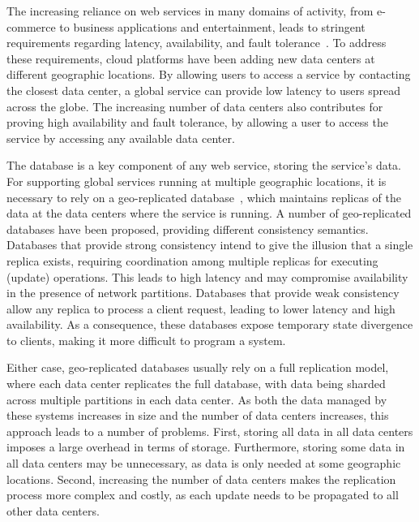 \documentclass[sigplan,10pt]{acmart}
\begin{document}
The increasing reliance on web services in many domains of activity, from e-commerce to business applications
and entertainment, leads to stringent requirements regarding latency, availability,
and fault tolerance~\cite{Schurman2009latency,gomez}.
To address these requirements, cloud platforms have been adding new data centers at different geographic 
locations. By allowing users to access a service by contacting the closest data center, a global service can
provide low latency to users spread across the globe. The increasing number of data centers also contributes
for proving high availability and fault tolerance, by allowing a user to access the service by accessing any
available data center.


The database is a key component of any web service, storing the service's data. For supporting global
services running at multiple geographic locations, it is necessary to rely on a geo-replicated database~\cite{dynamo},
which maintains replicas of the data at the data centers where the service is running.
A number of geo-replicated databases have been proposed, providing different consistency semantics.
Databases that provide strong consistency \cite{spanner,cockroachdb,mdcc} intend to give  the illusion that 
a single replica exists, requiring coordination among
multiple replicas for executing (update) operations. This leads to high latency and may compromise 
availability in the presence of network partitions.
Databases that provide weak consistency \cite{eventual,dynamo,cops} allow any replica to process a
client request, leading to lower latency and high availability. As a consequence, these databases expose
temporary state divergence to clients, making it more difficult to program a system. 

Either case, geo-replicated databases usually rely on a full replication model, where each data 
center replicates the full database, with data being sharded across multiple partitions in each data 
center. 
As both the data managed by these systems increases in size and the number of data centers increases,
this approach leads to a number of problems.
First, storing all data in all data centers imposes a large overhead in terms of storage. 
Furthermore, storing some data in all data centers may be unnecessary, as data is only needed at some
geographic locations.
Second, increasing the number of data centers makes the replication process more complex and costly, 
as each update needs to be propagated to all other data centers.
\end{document}
